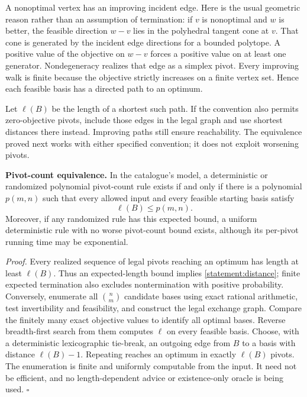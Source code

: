 \documentclass[11pt,a4paper]{article}
\numberwithin{equation}{section}
\begin{document}
A nonoptimal vertex has an improving incident edge.  Here is the usual
geometric reason rather than an assumption of termination: if $v$ is
nonoptimal and $w$ is better, the feasible direction $w-v$ lies in the
polyhedral tangent cone at $v$.  That cone is generated by the incident
edge directions for a bounded polytope.  A positive value of the
objective on $w-v$ forces a positive value on at least one generator.
Nondegeneracy realizes that edge as a simplex pivot.  Every improving
walk is finite because the objective strictly increases on a finite
vertex set.  Hence each feasible basis has a directed path to an optimum.

Let $\ell(B)$ be the length of a shortest such path.  If the convention
also permits zero-objective pivots, include those edges in the legal
graph and use shortest distances there instead.  Improving paths still
ensure reachability.  The equivalence proved next works with either
specified convention; it does not exploit worsening pivots.

\textbf{Pivot-count equivalence.}
In the catalogue's model, a deterministic or randomized polynomial
pivot-count rule exists if and only if there is a polynomial $p(m,n)$
such that every allowed input and every feasible starting basis satisfy
\begin{equation}\label{statement:distance}
 \ell(B)\leq p(m,n).
\end{equation}
Moreover, if any randomized rule has this expected bound, a uniform
deterministic rule with no worse pivot-count bound exists, although
its per-pivot running time may be exponential.

\emph{Proof.} Every realized sequence of legal pivots reaching an
optimum has length at least $\ell(B)$.  Thus an expected-length bound
implies \eqref{statement:distance}; finite expected termination also excludes
nontermination with positive probability.  Conversely, enumerate all
$\binom nm$ candidate bases using exact rational arithmetic, test
invertibility and feasibility, and construct the legal exchange graph.
Compare the finitely many exact objective values to identify all
optimal bases.  Reverse breadth-first search from them computes
$\ell$ on every feasible basis.  Choose, with a deterministic
lexicographic tie-break, an outgoing edge from $B$ to a basis with
distance $\ell(B)-1$.  Repeating reaches an optimum in exactly
$\ell(B)$ pivots.  The enumeration is finite and uniformly computable
from the input.  It need not be efficient, and no length-dependent
advice or existence-only oracle is being used. \hfill$\square$
\end{document}

